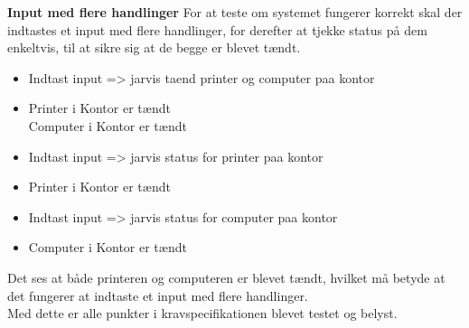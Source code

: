 {\bf Input med flere handlinger}
For at teste om systemet fungerer korrekt skal der indtastes et input med flere handlinger, for derefter at tjekke status på dem enkeltvis, til at sikre sig at de begge er blevet tændt.
\begin{itemize}[itemsep=0ex,topsep=1ex]
    \item Indtast input => jarvis taend printer og computer paa kontor
    \item Printer i Kontor er tændt\\
          Computer i Kontor er tændt
    \item Indtast input => jarvis status for printer paa kontor
    \item Printer i Kontor er tændt
    \item Indtast input => jarvis status for computer paa kontor
    \item Computer i Kontor er tændt
\end{itemize}
Det ses at både printeren og computeren er blevet tændt, hvilket må betyde at det fungerer at indtaste et input med flere handlinger.\\

Med dette er alle punkter i kravspecifikationen blevet testet og belyst.